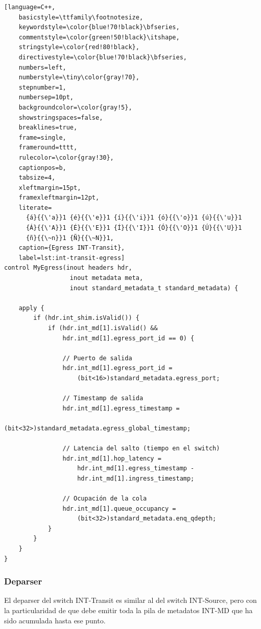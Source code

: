 \begin{lstlisting}[language=C++,
    basicstyle=\ttfamily\footnotesize,
    keywordstyle=\color{blue!70!black}\bfseries,
    commentstyle=\color{green!50!black}\itshape,
    stringstyle=\color{red!80!black},
    directivestyle=\color{blue!70!black}\bfseries,
    numbers=left,
    numberstyle=\tiny\color{gray!70},
    stepnumber=1,
    numbersep=10pt,
    backgroundcolor=\color{gray!5},
    showstringspaces=false,
    breaklines=true,
    frame=single,
    frameround=tttt,
    rulecolor=\color{gray!30},
    captionpos=b,
    tabsize=4,
    xleftmargin=15pt,
    framexleftmargin=12pt,
    literate=
      {á}{{\'a}}1 {é}{{\'e}}1 {í}{{\'i}}1 {ó}{{\'o}}1 {ú}{{\'u}}1
      {Á}{{\'A}}1 {É}{{\'E}}1 {Í}{{\'I}}1 {Ó}{{\'O}}1 {Ú}{{\'U}}1
      {ñ}{{\~n}}1 {Ñ}{{\~N}}1,
    caption={Egress INT-Transit}, 
    label=lst:int-transit-egress]
control MyEgress(inout headers hdr,
                  inout metadata meta,
                  inout standard_metadata_t standard_metadata) {

    apply {
        if (hdr.int_shim.isValid()) {
            if (hdr.int_md[1].isValid() && 
                hdr.int_md[1].egress_port_id == 0) {
                
                // Puerto de salida
                hdr.int_md[1].egress_port_id = 
                    (bit<16>)standard_metadata.egress_port;
                
                // Timestamp de salida
                hdr.int_md[1].egress_timestamp = 
                    (bit<32>)standard_metadata.egress_global_timestamp;
                
                // Latencia del salto (tiempo en el switch)
                hdr.int_md[1].hop_latency = 
                    hdr.int_md[1].egress_timestamp - 
                    hdr.int_md[1].ingress_timestamp;
                
                // Ocupación de la cola
                hdr.int_md[1].queue_occupancy = 
                    (bit<32>)standard_metadata.enq_qdepth;
            }
        }
    }
}
\end{lstlisting}


\subsubsection{Deparser}
El deparser del switch INT-Transit es similar al del switch INT-Source, pero con la particularidad de que debe emitir toda la pila de metadatos INT-MD que ha sido acumulada hasta ese punto.

